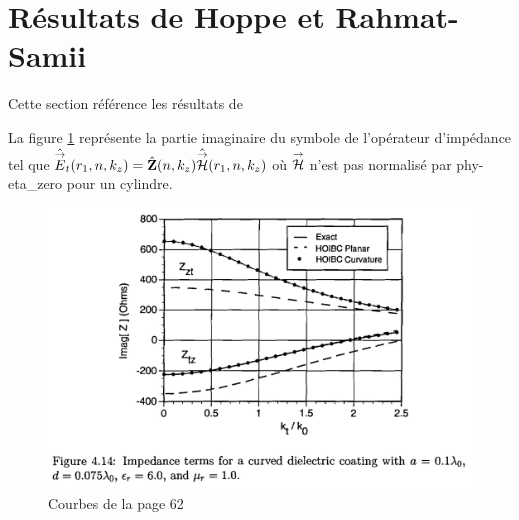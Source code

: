 \section{Résultats de Hoppe et Rahmat-Samii}

Cette section référence les résultats de \cite{hoppe_impedance_1995}


La figure \ref{fig:annex:hoppe:p62} représente la partie imaginaire du symbole de l'opérateur d'impédance tel que \( \hat{{\overset{\rightarrow}{E}}}_t(r_1,n,k_z) = \hat{\mathbf{Z}}(n,k_z) \hat{{\overset{\rightarrow}{\mathcal{H}}}}(r_1,n,k_z) \) où ${\overset{\rightarrow}{\mathcal{H}}}$ n'est pas normalisé par \gls{phy-eta_zero} pour un cylindre.

\begin{figure}[h!tb]
    \includegraphics[width=\textwidth]{images/hoppe/p62_imp_cylindre.png}
    \caption{Courbes de la page 62}
    \label{fig:annex:hoppe:p62}
\end{figure}